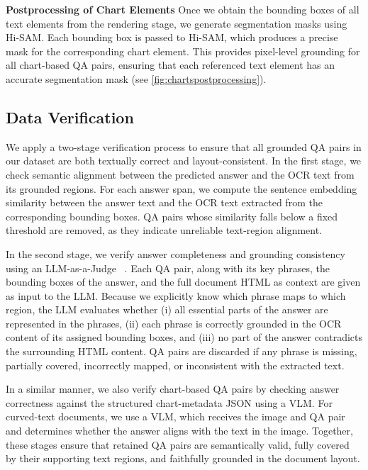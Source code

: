 \textbf{Postprocessing of Chart Elements} 
Once we obtain the bounding boxes of all text elements from the rendering stage, we generate segmentation masks using Hi-SAM. Each bounding box is passed to Hi-SAM, which produces a precise mask for the corresponding chart element. This provides pixel-level grounding for all chart-based QA pairs, ensuring that each referenced text element has an accurate segmentation mask  (see \cref{fig:chartspostprocessing}). 

\subsection{Data Verification}

We apply a two-stage verification process to ensure that all grounded QA pairs in our dataset are both textually correct and layout-consistent.
In the first stage, we check semantic alignment between the predicted answer and the OCR text from its grounded regions. For each answer span, we compute the sentence embedding similarity between the answer text and the OCR text extracted from the corresponding bounding boxes. QA pairs whose similarity falls below a fixed threshold are removed, as they indicate unreliable text-region alignment.

In the second stage, we verify answer completeness and grounding consistency using an LLM-as-a-Judge ~\cite{deepseekai2025deepseekr1incentivizingreasoningcapability,zheng2023judging}. Each QA pair, along with its key phrases, the bounding boxes of the answer, and the full document HTML as context are given as input to the LLM. Because we explicitly know which phrase maps to which region, the LLM evaluates whether (i) all essential parts of the answer are represented in the phrases, (ii) each phrase is correctly grounded in the OCR content of its assigned bounding boxes, and (iii) no part of the answer contradicts the surrounding HTML content. QA pairs are discarded if any phrase is missing, partially covered, incorrectly mapped, or inconsistent with the extracted text.

In a similar manner, we also verify chart-based QA pairs by checking answer correctness against the structured chart-metadata JSON using a VLM. For curved-text documents, we use a VLM, which receives the image and QA pair and determines whether the answer aligns with the text in the image. 
Together, these stages ensure that retained QA pairs are semantically valid, fully covered by their supporting text regions, and faithfully grounded in the document layout.


